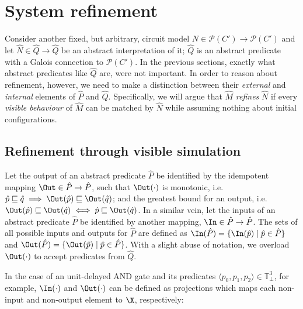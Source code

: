 \section{System refinement}

Consider another fixed, but arbitrary, circuit model $N \in \mathcal{P}(C') \rightarrow \mathcal{P}(C')$ and let $\hat N \in \hat Q \rightarrow \hat Q$ be an abstract interpretation of it; $\hat Q$ is an abstract predicate with a Galois connection to $\mathcal{P}(C')$. In the previous sections, exactly what abstract predicates like $\hat Q$ are, were not important. In order to reason about refinement, however, we need to make a distinction between their \textit{external} and \textit{internal} elements of $\hat P$ and $\hat Q$. Specifically, we will argue that $\hat M$ \textit{refines} $\hat N$ if every \textit{visible behaviour} of $\hat M$ can be matched by $\hat N$ while assuming nothing about initial configurations.

\subsection{Refinement through visible simulation}


Let the output of an abstract predicate $\hat P$ be identified by the idempotent mapping $\Out \in \hat P \rightarrow \hat P$, such that $\Out(\cdot)$ is monotonic, i.e. $\hat p \sqsubseteq \hat q \implies \Out(\hat p) \sqsubseteq \Out(\hat q)$; and the greatest bound for an output, i.e. $\Out(\hat p) \sqsubseteq \Out(\hat q) \iff \hat p \sqsubseteq \Out(\hat q)$. In a similar vein, let the inputs of an abstract predicate $\hat P$ be identified by another mapping, $\In \in \hat P \rightarrow \hat P$. The sets of all possible inputs and outputs for $\hat P$ are defined as $\In(\hat P) = \{ \In(\hat p) \mid \hat p \in \hat P \}$ and $\Out(\hat P) = \{ \Out(\hat p) \mid \hat p \in \hat P \}$. With a slight abuse of notation, we overload $\Out(\cdot)$ to accept predicates from $\hat Q$.

In the case of an unit-delayed AND gate and its predicates $\langle p_{0}, p_{1}, p_{2} \rangle \in \mathbb{T}_{\bot}^{3}$, for example, $\In(\cdot)$ and $\Out(\cdot)$ can be defined as projections which maps each non-input and non-output element to $\X$, respectively:

